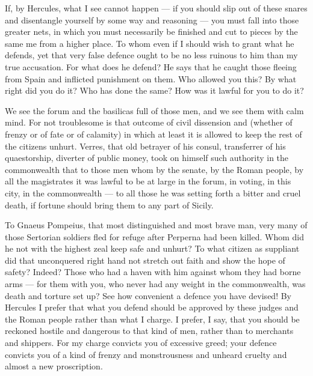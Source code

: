  If, by Hercules, what I see cannot happen --- if you should slip out of these snares and disentangle yourself by some way and reasoning --- you must fall into those greater nets, in which you must necessarily be finished and cut to pieces by the same me from a higher place. To whom even if I should wish to grant what he defends, yet that very false defence ought to be no less ruinous to him than my true accusation. For what does he defend? He says that he caught those fleeing from Spain and inflicted punishment on them. Who allowed you this? By what right did you do it? Who has done the same? How was it lawful for you to do it?

 We see the forum and the basilicas full of those men, and we see them with calm mind. For not troublesome is that outcome of civil dissension and (whether of frenzy or of fate or of calamity) in which at least it is allowed to keep the rest of the citizens unhurt. Verres, that old betrayer of his consul, transferrer of his quaestorship, diverter of public money, took on himself such authority in the commonwealth that to those men whom by the senate, by the Roman people, by all the magistrates it was lawful to be at large in the forum, in voting, in this city, in the commonwealth --- to all those he was setting forth a bitter and cruel death, if fortune should bring them to any part of Sicily.

 To Gnaeus Pompeius, that most distinguished and most brave man, very many of those Sertorian soldiers fled for refuge after Perperna had been killed. Whom did he not with the highest zeal keep safe and unhurt? To what citizen as suppliant did that unconquered right hand not stretch out faith and show the hope of safety? Indeed? Those who had a haven with him against whom they had borne arms --- for them with you, who never had any weight in the commonwealth, was death and torture set up? See how convenient a defence you have devised! By Hercules I prefer that what you defend should be approved by these judges and the Roman people rather than what I charge. I prefer, I say, that you should be reckoned hostile and dangerous to that kind of men, rather than to merchants and shippers. For my charge convicts you of excessive greed; your defence convicts you of a kind of frenzy and monstrousness and unheard cruelty and almost a new proscription.

